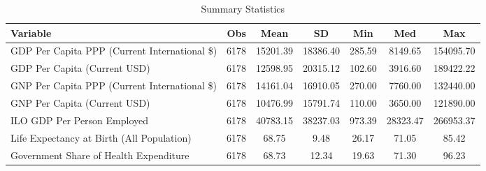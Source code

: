 \begin{table}
\centering
\caption{Summary Statistics}
\label{Sum_Stats}
\begin{tabular}{lcccccc}
\toprule
                                    Variable &  Obs &     Mean &       SD &    Min &      Med &       Max \\
\midrule
GDP Per Capita PPP (Current International \$) & 6178 & 15201.39 & 18386.40 & 285.59 & 8149.65 & 154095.70 \\
GDP Per Capita (Current USD) & 6178 & 12598.95 & 20315.12 & 102.60 & 3916.60 & 189422.22 \\
GNP Per Capita PPP (Current International \$) & 6178 & 14161.04 & 16910.05 & 270.00 & 7760.00 & 132440.00 \\
GNP Per Capita (Current USD) & 6178 & 10476.99 & 15791.74 & 110.00 & 3650.00 & 121890.00 \\
ILO GDP Per Person Employed & 6178 & 40783.15 & 38237.03 & 973.39 & 28323.47 & 266953.37 \\
Life Expectancy at Birth (All Population) & 6178 & 68.75 & 9.48 & 26.17 & 71.05 & 85.42 \\
Government Share of Health Expenditure & 6178 & 68.73 & 12.34 & 19.63 & 71.30 & 96.23 \\
\bottomrule
\end{tabular}
\end{table}
